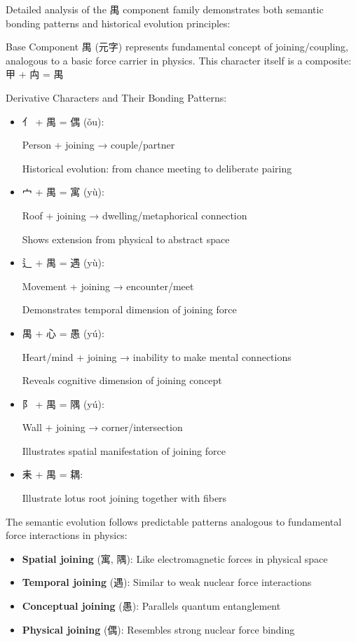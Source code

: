 \documentclass[
  11pt,
  letterpaper,
]{article}
\providecommand{\tightlist}{%
  \setlength{\itemsep}{0pt}\setlength{\parskip}{0pt}}
\begin{document}
Detailed analysis of the 禺 component family demonstrates both semantic
bonding patterns and historical evolution principles:

Base Component 禺 (元字) represents fundamental concept of
joining/coupling, analogous to a basic force carrier in physics. This
character itself is a composite: 甲 + 禸 = 禺

Derivative Characters and Their Bonding Patterns:

\begin{itemize}
\item
  亻 + 禺 = 偶 (ǒu):

  Person + joining → couple/partner

  Historical evolution: from chance meeting to deliberate pairing
\item
  宀 + 禺 = 寓 (yù):

  Roof + joining → dwelling/metaphorical connection

  Shows extension from physical to abstract space
\item
  辶 + 禺 = 遇 (yù):

  Movement + joining → encounter/meet

  Demonstrates temporal dimension of joining force
\item
  禺 + 心 = 愚 (yú):

  Heart/mind + joining → inability to make mental connections

  Reveals cognitive dimension of joining concept
\item
  阝 + 禺 = 隅 (yú):

  Wall + joining → corner/intersection

  Illustrates spatial manifestation of joining force
\item
  耒 + 禺 = 耦:

  Illustrate lotus root joining together with fibers
\end{itemize}

The semantic evolution follows predictable patterns analogous to
fundamental force interactions in physics:

\begin{itemize}
\tightlist
\item
  \textbf{Spatial joining} (寓, 隅): Like electromagnetic forces in
  physical space
\item
  \textbf{Temporal joining} (遇): Similar to weak nuclear force
  interactions
\item
  \textbf{Conceptual joining} (愚): Parallels quantum entanglement
\item
  \textbf{Physical joining} (偶): Resembles strong nuclear force binding
\end{itemize}
\end{document}
